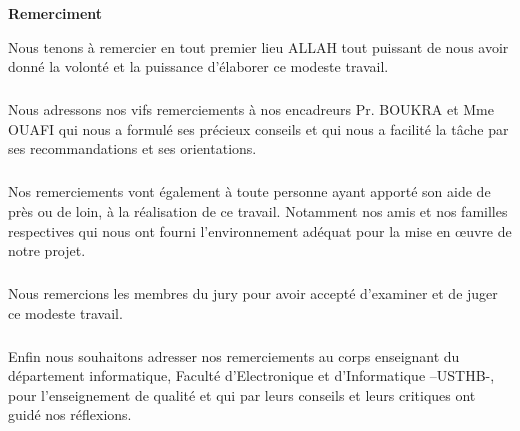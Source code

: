 
\begin{center}
	\Large\textbf{Remerciment}
\end{center}

\large{Nous tenons à remercier en tout premier lieu ALLAH tout  puissant de nous avoir donné la volonté et la puissance d’élaborer ce modeste travail.
\subparagraph{}
Nous adressons nos vifs remerciements à nos encadreurs Pr. BOUKRA et Mme OUAFI qui nous a formulé ses précieux conseils et qui nous a  facilité la tâche par ses recommandations et ses  orientations.
\subparagraph{}
Nos remerciements vont également à toute personne ayant apporté son aide de près ou de loin, à la réalisation de ce travail. Notamment nos amis et nos familles respectives qui nous ont fourni l'environnement adéquat pour la mise en œuvre de notre projet.
\subparagraph{}
Nous remercions les membres du jury pour avoir accepté d’examiner et de juger ce modeste travail.
\subparagraph{}
Enfin nous souhaitons adresser nos remerciements au corps enseignant du département informatique, Faculté d'Electronique et d'Informatique –USTHB-, pour l'enseignement de qualité et qui par leurs conseils et leurs critiques ont guidé nos réflexions.}